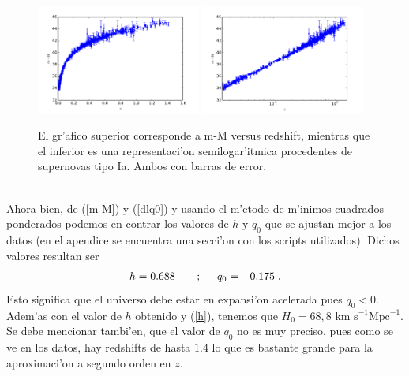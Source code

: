 \begin{figure}[h!]
  \centering
\includegraphics[width=0.48\textwidth]{fig/m-M-versus-z-con-error.pdf}
\includegraphics[width=0.48\textwidth]{fig/m-M_vs_z_semilog.pdf}
 \caption{El gr'afico superior corresponde a m-M versus redshift, mientras que el inferior es una representaci'on semilogar'itmica procedentes de supernovas tipo Ia. Ambos con barras de error.}
  \label{zvsm-M}
  \end{figure}\\
Ahora bien, de (\ref{m-M}) y (\ref{dlq0}) y usando el m'etodo de m'inimos cuadrados ponderados podemos en contrar los valores de 
$h$ y $q_0$ que se ajustan mejor a los datos (en el apendice se encuentra una secci'on con los scripts utilizados). Dichos valores
resultan ser
\begin{eqnarray}
h=0.688 \qquad; \hspace{0.5cm} q_0=-0.175\hspace{0.1cm}. 
\end{eqnarray}
Esto significa que el universo debe estar en expansi'on acelerada pues $q_0<0$. Adem'as con el valor de $h$  obtenido 
y (\ref{h}), tenemos que $H_0= 68,8 \mbox{ km s}^{-1}\mbox{Mpc}^{-1}$. Se debe mencionar tambi'en, que el valor de $q_0$
no es muy preciso, pues como se ve en los datos, hay redshifts de hasta $1.4$ lo que es bastante grande para la aproximaci'on 
a segundo orden en $z$.\\
